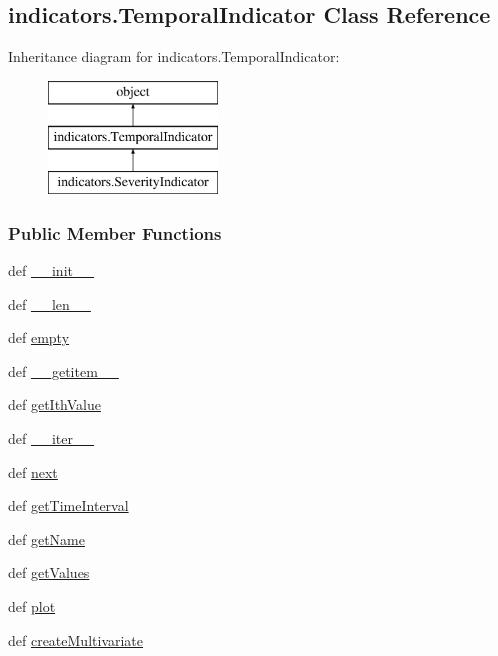 \hypertarget{classindicators_1_1TemporalIndicator}{\subsection{indicators.\-Temporal\-Indicator Class Reference}
\label{classindicators_1_1TemporalIndicator}
}
Inheritance diagram for indicators.\-Temporal\-Indicator\-:\begin{figure}[H]
\begin{center}
\leavevmode
\includegraphics[height=3.000000cm]{classindicators_1_1TemporalIndicator}
\end{center}
\end{figure}
\subsubsection*{Public Member Functions}
\begin{DoxyCompactItemize}
\item 
def \hyperlink{classindicators_1_1TemporalIndicator_a463e11be2a6a063a59bf831fd867309a}{\-\_\-\-\_\-init\-\_\-\-\_\-}
\item 
def \hyperlink{classindicators_1_1TemporalIndicator_ad9b5ae86d727f25eff7b3b546c22c3c9}{\-\_\-\-\_\-len\-\_\-\-\_\-}
\item 
def \hyperlink{classindicators_1_1TemporalIndicator_a8b9ef621496abab3874175ac81e021b6}{empty}
\item 
def \hyperlink{classindicators_1_1TemporalIndicator_a88b26fa79b6182c628c325b71dc2432a}{\-\_\-\-\_\-getitem\-\_\-\-\_\-}
\item 
def \hyperlink{classindicators_1_1TemporalIndicator_a0e625db3ea29ed92aac40e1a7ec2da1e}{get\-Ith\-Value}
\item 
def \hyperlink{classindicators_1_1TemporalIndicator_accc477f6e8550d937607f638aea72409}{\-\_\-\-\_\-iter\-\_\-\-\_\-}
\item 
def \hyperlink{classindicators_1_1TemporalIndicator_a6bd317279baa86a0de3e229dc08663db}{next}
\item 
def \hyperlink{classindicators_1_1TemporalIndicator_ac81609da0362fce945083a98714e7648}{get\-Time\-Interval}
\item 
def \hyperlink{classindicators_1_1TemporalIndicator_a30cc32ba6fe3c7d09fa3c12edd39de5f}{get\-Name}
\item 
def \hyperlink{classindicators_1_1TemporalIndicator_a205d3ea2adf6f45fc8a03737d27a51a9}{get\-Values}
\item 
def \hyperlink{classindicators_1_1TemporalIndicator_a41347d3e000a49f6ea63628d83bdcbd5}{plot}
\item 
def \hyperlink{classindicators_1_1TemporalIndicator_a97aa4581e8ff9e6839181858ff5e3d19}{create\-Multivariate}
\end{DoxyCompactItemize}

